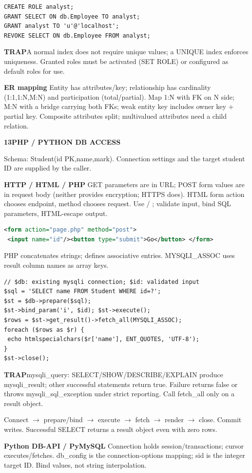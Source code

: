 \documentclass[a4paper]{article}
\newcommand{\sqlfont}{\ttfamily}
\newcommand{\bodyfontsize}{5.55}
\newcommand{\bodyleading}{5.3}
\newcommand{\bodylineskiplimit}{-2pt}
\newcommand{\bodystyle}{%
  \fontsize{\bodyfontsize}{\bodyleading}\selectfont\setlength{\lineskiplimit}{\bodylineskiplimit}\RaggedRight
  \setlength{\abovedisplayskip}{.5pt}\setlength{\belowdisplayskip}{.5pt}%
  \setlength{\abovedisplayshortskip}{.3pt}\setlength{\belowdisplayshortskip}{.3pt}}
\newcommand{\topic}[2]{\par\addvspace{.45pt}\nointerlineskip%
  \begingroup\setlength{\fboxsep}{0.35pt}%
  \noindent\colorbox{structure}{\parbox{\dimexpr\linewidth-2\fboxsep\relax}{%
    \color{white}\fontsize{6.45}{6.8}\selectfont\bfseries #1\enspace #2}}%
  \endgroup\par\nobreak\vspace{.55pt}\nointerlineskip\nobreak}
\newenvironment{topicblock}
  {\par\bodystyle}
  {\par}
\newcommand{\key}[1]{\par\textcolor{structure}{\textbf{#1}}\enspace}
\newcommand{\note}[4]{\par\nointerlineskip\vspace{.25pt}\begingroup\setlength{\fboxsep}{0.1pt}%
  \noindent\colorbox{#1}{\parbox{\dimexpr\linewidth-2\fboxsep\relax}{%
    \RaggedRight\textcolor{#2}{\textbf{#3}}\enspace #4}}%
  \endgroup\par\nointerlineskip\vspace{.25pt}}
\newcommand{\trap}[1]{\note{warningbg}{warning}{TRAP}{#1}}
\newcommand{\sql}[1]{{\sqlfont\color{sqltext}\detokenize{#1}}}
\newlength{\sheetwidth}
\newenvironment{sheetcolumns}[1]
  {\noindent\begin{minipage}[t]{#1\sheetwidth}\vspace{0pt}\bodystyle\ignorespaces}
  {\end{minipage}\par}
\begin{document}
\begin{sheetcolumns}{.254}
\begin{topicblock}
\begin{lstlisting}
CREATE ROLE analyst;
GRANT SELECT ON db.Employee TO analyst;
GRANT analyst TO 'u'@'localhost';
REVOKE SELECT ON db.Employee FROM analyst;
\end{lstlisting}
\trap{A normal index does not require unique values; a UNIQUE index enforces uniqueness. Granted roles must be activated (SET ROLE) or configured as default roles for use.}
\key{ER mapping}
Entity has attributes/key; relationship has cardinality (1:1,1:N,M:N) and participation (total/partial). Map 1:N with FK on N side; M:N with a bridge carrying both FKs; weak entity key includes owner key + partial key. Composite attributes split; multivalued attributes need a child relation.
\end{topicblock}

\begin{topicblock}
\topic{13}{PHP / PYTHON DB ACCESS}
Schema: Student(id PK,name,mark). Connection settings and the target student ID are supplied by the caller.
\key{HTTP / HTML / PHP}
GET parameters are in URL; POST form values are in request body (neither provides encryption; HTTPS does). HTML form action chooses endpoint, method chooses request. Use \sql{$_GET['id']} / \sql{$_POST['id']}; validate input, bind SQL parameters, HTML-escape output.
\begin{lstlisting}[style=Plaincode,language=XML]
<form action="page.php" method="post">
 <input name="id"/><button type="submit">Go</button> </form>
\end{lstlisting}
PHP \sql{.} concatenates strings; \sql{key => value} defines associative entries. MYSQLI\_ASSOC uses result column names as array keys.
\begin{lstlisting}[style=PHPcode,language=PHPx]
// $db: existing mysqli connection; $id: validated input
$sql = 'SELECT name FROM Student WHERE id=?';
$st = $db->prepare($sql);
$st->bind_param('i', $id); $st->execute();
$rows = $st->get_result()->fetch_all(MYSQLI_ASSOC);
foreach ($rows as $r) {
 echo htmlspecialchars($r['name'], ENT_QUOTES, 'UTF-8');
}
$st->close();
\end{lstlisting}
\trap{mysqli\_query: SELECT/SHOW/DESCRIBE/EXPLAIN produce mysqli\_result; other successful statements return true. Failure returns false or throws mysqli\_sql\_exception under strict reporting. Call fetch\_all only on a result object.}
Connect $\to$ prepare/bind $\to$ execute $\to$ fetch $\to$ render $\to$ close. Commit writes. Successful SELECT returns a result object even with zero rows.
\key{Python DB-API / PyMySQL}
Connection holds session/transactions; cursor executes/fetches. db\_config is the connection-options mapping; sid is the integer target ID. Bind values, not string interpolation.

\end{topicblock}
\end{sheetcolumns}
\end{document}
